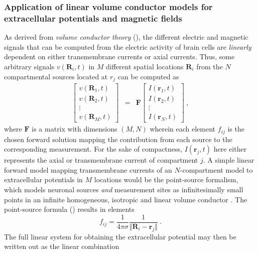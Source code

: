 
\subsubsection{Application of linear volume conductor models for extracellular potentials and magnetic fields}

As derived from \textit{volume conductor theory} (),
the different electric and magnetic signals that can be computed from the electric activity of brain cells are \textit{linearly} dependent on either transmembrane currents or axial currents.
Thus, some arbitrary signals $v(\mathbf{R}_i, t)$ in $M$ different spatial locations $\mathbf{R}_i$ from the $N$ compartmental sources located at $r_j$ can be computed as
%
\begin{eqnarray}
\begin{bmatrix}
v(\mathbf{R}_1, t) \\
v(\mathbf{R}_2, t) \\
\vdots \\
v(\mathbf{R}_M, t)
\end{bmatrix}
&=& \mathbf{F}
\begin{bmatrix}
I(\mathbf{r}_1, t) \\
I(\mathbf{r}_2, t) \\
\vdots \\
I(\mathbf{r}_N, t)
\end{bmatrix} ~,
\end{eqnarray}
%
where $\mathbf{F}$ is a matrix with dimensions $(M, N)$ wherein each element $f_{ij}$ is the chosen forward solution mapping the contribution from each source to the corresponding measurement.
For the sake of compactness, $I(\mathbf{r}_j, t)$ here either represents the axial or transmembrane current of compartment $j$.
A simple linear forward model mapping transmembrane currents of an $N$-compartment model to extracellular potentials in $M$ locations would be the point-source formalism,
which models neuronal sources \textit{and} measurement sites as infinitesimally small points in an infinite homogeneous, isotropic and linear volume conductor .
The point-source formula () results in elements
%
\begin{equation}
f_{ij} = \frac{1}{4\pi\sigma}\frac{1}{\Vert\mathbf{R}_i - \mathbf{r}_j\Vert}  ~.
\end{equation}
%
The full linear system for obtaining the extracellular potential may then be written out as the linear combination
